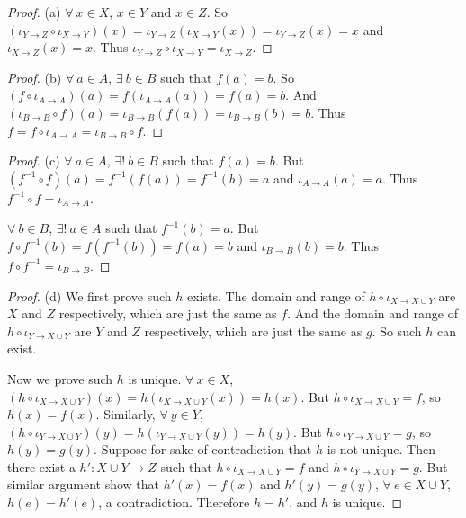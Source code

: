 \begin{proof}{(a)}
\(\forall\ x \in X\), \(x \in Y\) and \(x \in Z\).
So \((\iota_{Y \to Z} \circ \iota_{X \to Y})(x) = \iota_{Y \to Z}(\iota_{X \to Y}(x)) = \iota_{Y \to Z}(x) = x\) and \(\iota_{X \to Z}(x) = x\).
Thus \(\iota_{Y \to Z} \circ \iota_{X \to Y} = \iota_{X \to Z}\).
\end{proof}

\begin{proof}{(b)}
\(\forall\ a \in A\), \(\exists\ b \in B\) such that \(f(a) = b\).
So \((f \circ \iota_{A \to A})(a) = f(\iota_{A \to A}(a)) = f(a) = b\).
And \((\iota_{B \to B} \circ f)(a) = \iota_{B \to B}(f(a)) = \iota_{B \to B}(b) = b\).
Thus \(f = f \circ \iota_{A \to A} = \iota_{B \to B} \circ f\).
\end{proof}

\begin{proof}{(c)}
\(\forall\ a \in A\), \(\exists!\ b \in B\) such that \(f(a) = b\).
But \((f^{-1} \circ f)(a) = f^{-1}(f(a)) = f^{-1}(b) = a\) and \(\iota_{A \to A}(a) = a\).
Thus \(f^{-1} \circ f = \iota_{A \to A}\).

\(\forall\ b \in B\), \(\exists!\ a \in A\) such that \(f^{-1}(b) = a\).
But \(f \circ f^{-1}(b) = f(f^{-1}(b)) = f(a) = b\) and \(\iota_{B \to B}(b) = b\).
Thus \(f \circ f^{-1} = \iota_{B \to B}\).
\end{proof}

\begin{proof}{(d)}
We first prove such \(h\) exists.
The domain and range of \(h \circ \iota_{X \to X \cup Y}\) are \(X\) and \(Z\) respectively, which are just the same as \(f\).
And the domain and range of \(h \circ \iota_{Y \to X \cup Y}\) are \(Y\) and \(Z\) respectively, which are just the same as \(g\).
So such \(h\) can exist.

Now we prove such \(h\) is unique.
\(\forall\ x \in X\), \((h \circ \iota_{X \to X \cup Y})(x) = h(\iota_{X \to X \cup Y}(x)) = h(x)\).
But \(h \circ \iota_{X \to X \cup Y} = f\), so \(h(x) = f(x)\).
Similarly, \(\forall\ y \in Y\), \((h \circ \iota_{Y \to X \cup Y})(y) = h(\iota_{Y \to X \cup Y}(y)) = h(y)\).
But \(h \circ \iota_{Y \to X \cup Y} = g\), so \(h(y) = g(y)\).
Suppose for sake of contradiction that \(h\) is not unique.
Then there exist a \(h': X \cup Y \to Z\) such that \(h \circ \iota_{X \to X \cup Y} = f\) and \(h \circ \iota_{Y \to X \cup Y} = g\).
But similar argument show that \(h'(x) = f(x)\) and \(h'(y) = g(y)\), \(\forall\ e \in X \cup Y\), \(h(e) = h'(e)\), a contradiction.
Therefore \(h = h'\), and \(h\) is unique.
\end{proof}